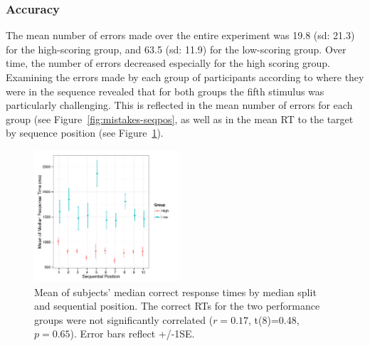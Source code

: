 \documentclass[man,floatsintext]{apa6}
\begin{document}

\subsubsection{Accuracy}

The mean number of errors made over the entire experiment was 19.8 (sd: 21.3) for the high-scoring group, and 63.5 (sd: 11.9) for the low-scoring group. Over time, the number of errors decreased especially for the high scoring group. Examining the errors made by each group of participants according to where they were in the sequence revealed that for both groups the fifth stimulus was particularly challenging. This is reflected in the mean number of errors for each group (see Figure~\ref{fig:mistakes-seqpos}, as well as in the mean RT to the target by sequence position (see Figure~\ref{fig:RT-seqpos}).

\begin{figure}[!h]
  \centering
  \includegraphics[width=0.48\textwidth]{figures/RL_HitRT_by_seqpos}
  \caption{Mean of subjects' median correct response times by median split and sequential position. The correct RTs for the two performance groups were not significantly correlated ($r=0.17$, t(8)=0.48, $p=0.65$). Error bars reflect +/-1SE.}
  \label{fig:RT-seqpos}
\end{figure}
\end{document}
